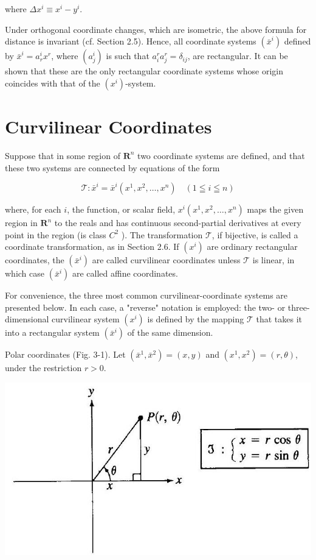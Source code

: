 \documentclass[10pt]{article}
\begin{document}
where $\Delta x^{i} \equiv x^{i}-y^{i}$.

Under orthogonal coordinate changes, which are isometric, the above formula for distance is invariant (cf. Section 2.5). Hence, all coordinate systems $\left(\bar{x}^{i}\right)$ defined by $\bar{x}^{i}=a_{r}^{i} x^{r}$, where $\left(a_{j}^{i}\right)$ is such that $a_{i}^{r} a_{j}^{r}=\delta_{i j}$, are rectangular. It can be shown that these are the only rectangular coordinate systems whose origin coincides with that of the $\left(x^{i}\right)$-system.

\section*{Curvilinear Coordinates}
Suppose that in some region of $\mathbf{R}^{n}$ two coordinate systems are defined, and that these two systems are connected by equations of the form


\begin{equation*}
\mathscr{T}: \bar{x}^{i}=\bar{x}^{i}\left(x^{1}, x^{2}, \ldots, x^{n}\right) \quad(1 \leqq i \leqq n) \tag{3.1}
\end{equation*}


where, for each $i$, the function, or scalar field, $x^{i}\left(x^{1}, x^{2}, \ldots, x^{n}\right)$ maps the given region in $\mathbf{R}^{n}$ to the reals and has continuous second-partial derivatives at every point in the region (is class $C^{2}$ ). The transformation $\mathscr{T}$, if bijective, is called a coordinate transformation, as in Section 2.6. If $\left(x^{i}\right)$ are ordinary rectangular coordinates, the $\left(\bar{x}^{i}\right)$ are called curvilinear coordinates unless $\mathscr{T}$ is linear, in which case $\left(\bar{x}^{i}\right)$ are called affine coordinates.

For convenience, the three most common curvilinear-coordinate systems are presented below. In each case, a "reverse" notation is employed: the two- or three-dimensional curvilinear system $\left(x^{i}\right)$ is defined by the mapping $\mathscr{T}$ that takes it into a rectangular system $\left(\bar{x}^{i}\right)$ of the same dimension.

Polar coordinates (Fig. 3-1). Let $\left(\bar{x}^{1}, \bar{x}^{2}\right)=(x, y)$ and $\left(x^{1}, x^{2}\right)=(r, \theta)$, under the restriction $r>0$.

\begin{center}
\includegraphics[max width=\textwidth]{2024_04_03_41f90be4f896e21f0dc9g-033}
\end{center}
\end{document}
